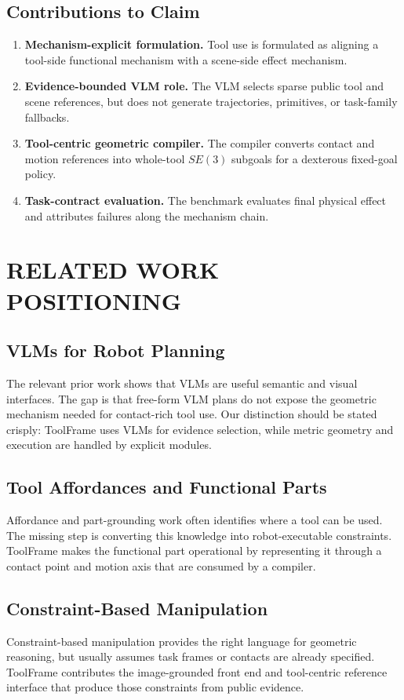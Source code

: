 \documentclass[letterpaper, 10 pt, conference]{ieeeconf}
\newcommand{\method}{ToolFrame}
\begin{document}
\subsection{Contributions to Claim}
\begin{enumerate}
  \item \textbf{Mechanism-explicit formulation.} Tool use is formulated as
  aligning a tool-side functional mechanism with a scene-side effect mechanism.
  \item \textbf{Evidence-bounded VLM role.} The VLM selects sparse public tool
  and scene references, but does not generate trajectories, primitives, or
  task-family fallbacks.
  \item \textbf{Tool-centric geometric compiler.} The compiler converts
  contact and motion references into whole-tool $SE(3)$ subgoals for a
  dexterous fixed-goal policy.
  \item \textbf{Task-contract evaluation.} The benchmark evaluates final
  physical effect and attributes failures along the mechanism chain.
\end{enumerate}

\section{RELATED WORK POSITIONING}

\subsection{VLMs for Robot Planning}
The relevant prior work shows that VLMs are useful semantic and visual
interfaces. The gap is that free-form VLM plans do not expose the geometric
mechanism needed for contact-rich tool use. Our distinction should be stated
crisply: \method{} uses VLMs for evidence selection, while metric geometry and
execution are handled by explicit modules.

\subsection{Tool Affordances and Functional Parts}
Affordance and part-grounding work often identifies where a tool can be used.
The missing step is converting this knowledge into robot-executable constraints.
\method{} makes the functional part operational by representing it through a
contact point and motion axis that are consumed by a compiler.

\subsection{Constraint-Based Manipulation}
Constraint-based manipulation provides the right language for geometric
reasoning, but usually assumes task frames or contacts are already specified.
\method{} contributes the image-grounded front end and tool-centric reference
interface that produce those constraints from public evidence.
\end{document}
